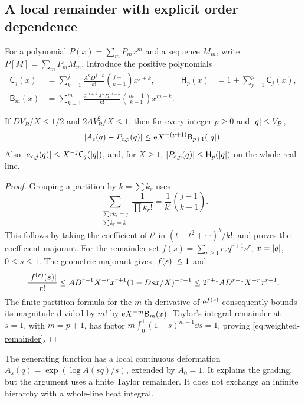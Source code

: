 \subsection{A local remainder with explicit order dependence}
For a polynomial \(P(x)=\sum_m P_mx^m\) and a sequence \(M_m\), write
\(P[M]=\sum_mP_mM_m\). Introduce the positive polynomials
\begin{subequations}\label{eq:majorant-polynomials}
\begin{align}
 \mathsf C_j(x)&=\sum_{k=1}^j
     \frac{A^kD^{j-k}}{k!}\binom{j-1}{k-1}x^{j+k},
 &\mathsf H_p(x)&=1+\sum_{j=1}^p\mathsf C_j(x),\\
 \mathsf B_m(x)&=\sum_{k=1}^m
       \frac{2^{m+k}A^kD^{m-k}}{k!}\binom{m-1}{k-1}x^{m+k}.
\end{align}
\end{subequations}
\begin{lemma}\label{lem:weighted}
If \(DV_B/X\le1/2\) and \(2AV_B^2/X\le1\), then for every integer
\(p\ge0\) and \(\lvert q\rvert\le V_B\),
\begin{equation}
 \lvert A_\epsilon(q)-P_{\epsilon,p}(q)\rvert
      \le \mathrm e X^{-(p+1)}\mathsf B_{p+1}(\lvert q\rvert).
 \label{eq:weighted-remainder}
\end{equation}
Also \(\lvert a_{\epsilon,j}(q)\rvert\le X^{-j}\mathsf C_j(\lvert q\rvert)\),
and, for \(X\ge1\), \(\lvert P_{\epsilon,p}(q)\rvert\le\mathsf H_p(\lvert q\rvert)\)
on the whole real line.
\end{lemma}
\begin{proof}
Grouping a partition by \(k=\sum k_r\) uses
\[
 \sum_{\substack{\sum rk_r=j\\\sum k_r=k}}\frac1{\prod k_r!}
                 =\frac1{k!}\binom{j-1}{k-1}.
\]
This follows by taking the coefficient of \(t^j\) in
\((t+t^2+\cdots)^k/k!\), and proves the coefficient majorant.
For the remainder set
\(f(s)=\sum_{r\ge1}c_rq^{r+1}s^r\), \(x=\lvert q\rvert\), \(0\le s\le1\).
The geometric majorant gives \(\lvert f(s)\rvert\le1\) and
\[
 \frac{\lvert f^{(r)}(s)\rvert}{r!}
 \le AD^{r-1}X^{-r}x^{r+1}(1-Dsx/X)^{-r-1}
 \le2^{r+1}AD^{r-1}X^{-r}x^{r+1}.
\]
The finite partition formula for the \(m\)-th derivative of
\(\mathrm e^{f(s)}\) consequently bounds its magnitude divided by \(m!\)
by \(\mathrm e X^{-m}\mathsf B_m(x)\).
Taylor's integral remainder at \(s=1\), with \(m=p+1\), has
factor \(m\int_0^1(1-s)^{m-1}\dd s=1\), proving
\eqref{eq:weighted-remainder}.
\end{proof}
The generating function has a local continuous deformation
\(A_s(q)=\exp(\log A(sq)/s)\), extended by \(A_0=1\).
It explains the grading, but the argument uses a finite Taylor
remainder. It does not exchange an infinite hierarchy with a
whole-line heat integral.
